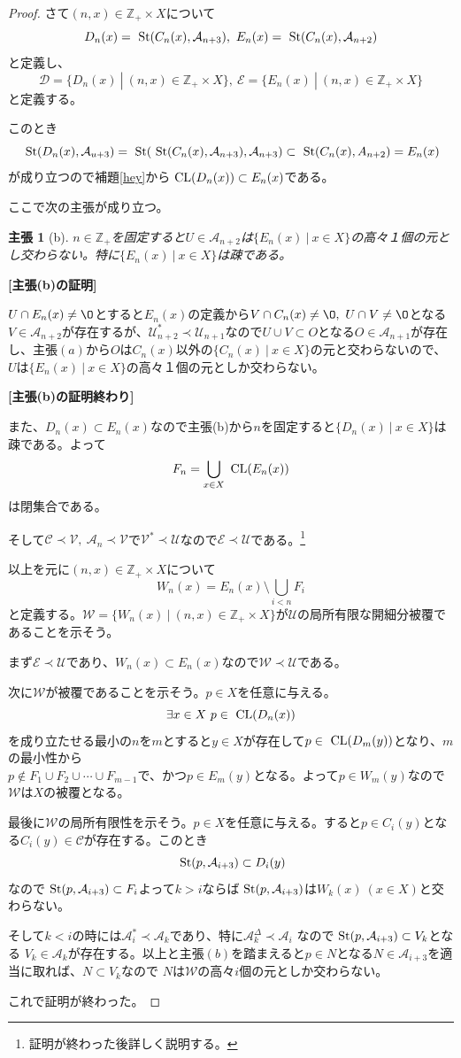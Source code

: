 \documentclass[leqno]{jsarticle}
\newtheorem*{claim}{主張}
\newcommand{\zz}{\mathbb{Z}}
\newcommand{\cl}{\text{  {\rm CL}} }
\newcommand{\uu}{\mathcal{U}}
\newcommand{\vv}{\mathcal{V}}
\newcommand{\A}{\mathcal{A}}
\newcommand{\s}{\text{  {\rm St}} }
\newcommand{\C}{\mathcal{C}}
\newcommand{\D}{\mathcal{D}}
\newcommand{\E}{\mathcal{E}}
\newcommand{\dd}{\Delta}
\newcommand{\pr}{\prec}
\newcommand{\zp}{\zz_{+}}
\begin{document}
\begin{proof}
さて$(n,x)\in \zp\times X$について
\[
D_n(x)=\s(C_n(x),\A_{n+3}),\ E_n(x)=\s(C_n(x),\A_{n+2})
\]
と定義し、
\[
\D=\{D_n(x)\ |\ (n,x)\in \zp\times X\},\ \E=\{E_n(x)\ |\ (n,x)\in \zp\times X\}
\]
と定義する。\par
このとき
\[
\s(D_n(x),\A_{u+3})=\s(\s(C_n(x),\A_{n+3}),\A_{n+3})\subset \s(C_n(x),A_{n+2})=E_n(x)
\]
が成り立つので補題\ref{hey}から$\cl(D_n(x))\subset E_n(x)$である。\par
ここで次の主張が成り立つ。
\begin{claim}[b]
$n\in \zp$を固定すると$U\in \A_{n+2}$は$\{E_n(x)\ |\ x\in X\}$の高々１個の元とし交わらない。特に$\{E_n(x)\ |\ x\in X\}$は疎である。
\end{claim}
{\bf [主張(b)の証明]}\par
$U\cap E_n(x)\neq\O$とすると$E_n(x)$の定義から$V\cap C_n(x)\neq\O,\ U\cap V\neq\O$となる$V\in \A_{n+2}$が存在するが、$\uu_{n+2}^{*}\pr \uu_{n+1}$なので$U\cup V\subset O$となる$O\in \A_{n+1}$が存在し、主張$(a)$から$O$は$C_n(x)$以外の$\{C_n(x)\ |\ x\in X\}$の元と交わらないので、$U$は$\{E_n(x)\ |\ x\in X\}$の高々１個の元としか交わらない。\par
{\bf [主張(b)の証明終わり]}\par
また、$D_n(x)\subset E_n(x)$なので主張(b)から$n$を固定すると$\{D_n(x)\ |\ x\in X\}$は疎である。よって
\[
F_n=\bigcup_{x\in X}\cl(E_n(x))
\]
は閉集合である。\par
そして$\C\pr \vv,\ \A_n\pr \vv$で$\vv^{*}\pr\uu$なので$\mathcal{E}\pr \uu$である。\footnote{証明が終わった後詳しく説明する。}\par
以上を元に$(n,x)\in \zp\times X$について
\[
W_n(x)=E_n(x)\setminus \bigcup_{i<n}F_i
\]
と定義する。$\mathcal{W}=\{W_n(x)\ |\ (n,x)\in \zp\times X\}$が$\uu$の局所有限な開細分被覆であることを示そう。\par
まず$\mathcal{E}\pr \uu$であり、$W_n(x)\subset E_n(x)$なので$\mathcal{W}\pr \uu$である。\par
次に$\mathcal{W}$が被覆であることを示そう。$p\in X$を任意に与える。
\[
\exists x\in X\ p\in \cl(D_n(x))
\]
を成り立たせる最小の$n$を$m$とすると$y\in X$が存在して$p\in \cl(D_m(y))$となり、$m$の最小性から\\
$p\not\in F_1\cup F_2\cup\cdots \cup F_{m-1}$で、かつ$p\in E_m(y)$となる。よって$p\in W_m(y)$なので$\mathcal{W}$は$X$の被覆となる。\par
最後に$\mathcal{W}$の局所有限性を示そう。$p\in X$を任意に与える。すると$p\in C_i(y)$となる$C_i(y)\in \C$が存在する。このとき
\[
\s(p,\A_{i+3})\subset D_i(y)
\]
なので$\s(p,\A_{i+3})\subset F_i$よって$k>i$ならば$\s(p,\A_{i+3})$は$W_k(x)\ (x\in X)$と交わらない。\par
そして$k< i$の時には$\A_i^{*}\pr \A_k$であり、特に$\A_k^{\dd}\pr \A_i$
なので$\s(p,\A_{i+3})\subset V_{k}$となる
$V_k\in \A_{k}$が存在する。以上と主張$(b)$を踏まえると$p\in N$となる$N\in \A_{i+3}$を適当に取れば、$N\subset V_k$なので
$N$は$\mathcal{W}$の高々$i$個の元としか交わらない。\par
これで証明が終わった。
\end{proof}
\end{document}
